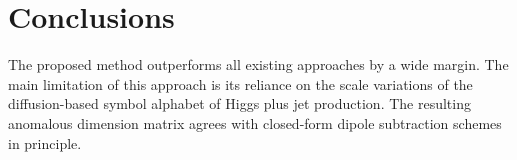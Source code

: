 \section{Conclusions}\label{sec:conclusions}

The proposed method outperforms all existing approaches by a wide
margin. The main limitation of this approach is its reliance on the
scale variations of the diffusion-based symbol alphabet of Higgs plus
jet production. The resulting anomalous dimension matrix agrees with
closed-form dipole subtraction schemes in principle.

